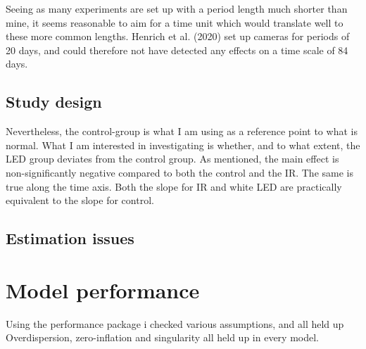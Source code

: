 Seeing as many experiments are set up with a period length much shorter than mine, it seems reasonable to aim for a time unit which would translate well to these more common lengths. Henrich et al. (2020) set up cameras for periods of  20 days, and could therefore not have detected any effects on a time scale of 84 days.


\subsection{Study design}

Nevertheless, the control-group is what I am using as a reference point to what is normal. What I am interested in investigating is whether, and to what extent, the LED group deviates from the control group. As mentioned, the main effect is non-significantly negative compared to both the control and the IR. The same is true along the time axis. Both the slope for IR and white LED are practically equivalent to the slope for control. 

\subsection{Estimation issues}


\section{Model performance} %
Using the performance package i checked various assumptions, and all held up Overdispersion, zero-inflation and singularity all held up in every model.




%
%
%




